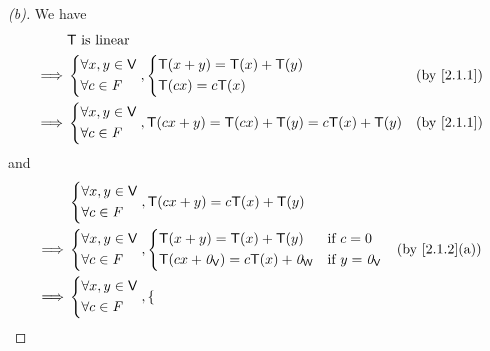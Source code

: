 \begin{proof}[(b)]
	We have
	\begin{align*}
		         & \T \text{ is linear}                                                       \\
		\implies & \begin{dcases}
			           \forall x, y \in \V \\
			           \forall c \in \F
		           \end{dcases}, \begin{dcases}
			                         \T(x + y) = \T(x) + \T(y) \\
			                         \T(cx) = c\T(x)
		                         \end{dcases}                               &  & \by{2.1.1}   \\
		\implies & \begin{dcases}
			           \forall x, y \in \V \\
			           \forall c \in \F
		           \end{dcases}, \T(cx + y) = \T(cx) + \T(y) = c\T(x) + \T(y) &  & \by{2.1.1}
	\end{align*}
	and
	\begin{align*}
		         & \begin{dcases}
			           \forall x, y \in \V \\
			           \forall c \in \F
		           \end{dcases}, \T(cx + y) = c\T(x) + \T(y)                                          \\
		\implies & \begin{dcases}
			           \forall x, y \in \V \\
			           \forall c \in \F
		           \end{dcases}, \begin{dcases}
			                         \T(x + y) = \T(x) + \T(y)             & \text{if } c = 0        \\
			                         \T(cx + \zv_{\V}) = c\T(x) + \zv_{\W} & \text{if } y = \zv_{\V}
		                         \end{dcases} &  & \by{2.1.2}[a]      \\
		\implies & \begin{dcases}
			           \forall x, y \in \V \\
			           \forall c \in \F
		           \end{dcases}, \begin{dcases}

\end{dcases}
\end{align*}
\end{proof}
